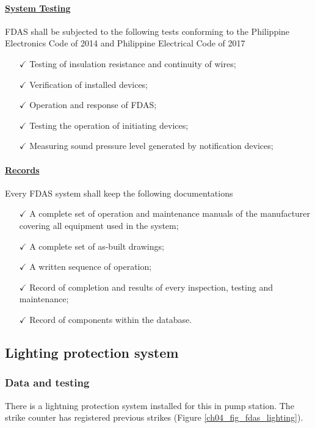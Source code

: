 \paragraph{\underline{System Testing }}

FDAS shall be subjected to the following tests conforming to the Philippine Electronics Code of 2014 and Philippine Electrical Code of 2017
\begin{itemize}%
	\item [$\checkmark$] Testing of insulation resistance and continuity of wires;
	\item [$\checkmark$] Verification of installed devices;
	\item [$\checkmark$] Operation and response of FDAS;
	\item [$\checkmark$] Testing the operation of initiating devices;
	\item [$\checkmark$] Measuring sound pressure level generated by notification devices;
\end{itemize}


\paragraph{\underline{Records }}

Every FDAS system shall keep the following documentations
\begin{itemize}%
	\item [$\checkmark$] A complete set of operation and maintenance manuals of the manufacturer covering all equipment used in the system;
	\item [$\checkmark$] A complete set of as-built drawings;
	\item [$\checkmark$] A written sequence of operation;
	\item [$\checkmark$] Record of completion and results of every inspection, testing and maintenance;
	\item [$\checkmark$] Record of components within the database.
\end{itemize}



\subsection{Lighting protection system} \label{ch04fdas02}
\subsubsection{Data and testing}
There is a lightning protection system installed for this in pump station. The strike counter has registered previous strikes (Figure \ref{ch04_fig_fdas_lighting}). 


